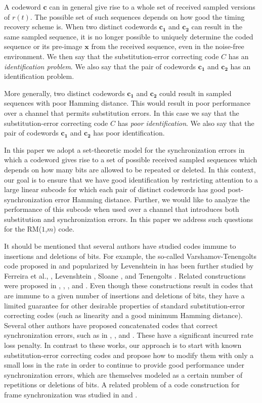 A codeword $\mathbf{c}$ can in general give rise to a whole set of
received sampled versions of $r(t)$. The possible set of such
sequences depends on how good the timing recovery scheme is. When
two distinct codewords $\mathbf{c_1}$ and $\mathbf{c_2}$ can
result in the same sampled sequence, it is no longer possible to
uniquely determine the coded sequence or its pre-image
$\mathbf{x}$ from the received sequence, even in the noise-free
environment. We then say that the substitution-error correcting
code $C$ has an \textit{identification problem}. We also say that
the pair of codewords $\mathbf{c_1}$ and $\mathbf{c_2}$ has an
identification problem.

More generally, two distinct codewords $\mathbf{c_1}$ and
$\mathbf{c_2}$ could result in sampled sequences with poor Hamming
distance. This would result in poor performance over a channel
that permits substitution errors. In this case we say that the
substitution-error correcting code $C$ has {\em poor
identification}. We also say that the pair of codewords
$\mathbf{c_1}$ and $\mathbf{c_2}$ has poor identification.

In this paper we adopt a set-theoretic model for the
synchronization errors in which a codeword gives rise to a set of
possible received sampled sequences which depends on how many bits
are allowed to be repeated or deleted. In this context, our goal
is to ensure that we have good identification by restricting
attention to a large linear subcode for which each pair of
distinct codewords has good post-synchronization error Hamming
distance. Further, we would like to analyze the performance of
this subcode when used over a channel that introduces both
substitution and synchronization errors. In this paper we address
such questions for the RM($1$,$m$) code.

It should be mentioned that several authors have studied codes
immune to insertions and deletions of bits. For example, the
so-called Varshamov-Tenengolts code proposed in \cite{vt:65} and
popularized by Levenshtein in \cite {lev:66} has been further
studied by Ferreira et al., \cite {ferr:97}, Levenshtein
\cite{lev:92}, Sloane \cite{sloane:00}, and Tenengolts
\cite{ten:84}. Related constructions were proposed in
\cite{bours:94}, \cite{calabi:69}, \cite{clarke:93},
\cite{klove:95} and \cite{ullman:66}. Even though these
constructions result in codes that are immune to a given number of
insertions and deletions of bits, they have a limited guarantee
for other desirable properties of standard substitution-error
correcting codes (such as linearity and a good minimum Hamming
distance). Several other authors have proposed concatenated codes
that correct synchronization errors, such as in \cite{cmnv:03},
\cite{cf:03}, and \cite{dmackay:01}. These have a significant
incurred rate loss penalty. In contrast to these works, our
approach is to start with known substitution-error correcting
codes and propose how to modify them with only a small loss in the
rate in order to continue to provide good performance under
synchronization errors, which are themselves modeled as a certain
number of repetitions or deletions of bits. A related problem of a
code construction for frame synchronization was studied in
\cite{stiffler:65} and \cite{bose:67}.

